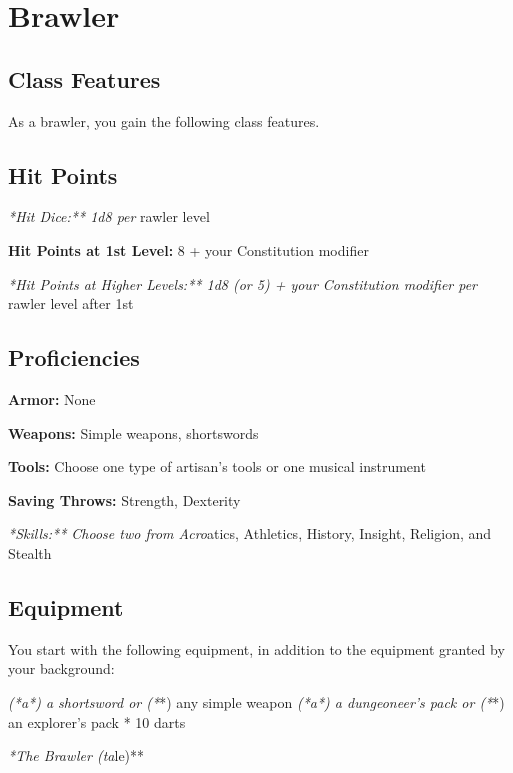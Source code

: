 \section{Brawler}

\subsection{Class Features}

As a brawler, you gain the following class features.

\subsection{Hit Points}

\textit{*Hit Dice:** 1d8 per }rawler level

\textbf{Hit Points at 1st Level:} 8 + your Constitution modifier

\textit{*Hit Points at Higher Levels:** 1d8 (or 5) + your Constitution modifier per }rawler level after 1st

\subsection{Proficiencies}

\textbf{Armor:} None

\textbf{Weapons:} Simple weapons, shortswords

\textbf{Tools:} Choose one type of artisan’s tools or one musical instrument

\textbf{Saving Throws:} Strength, Dexterity

\textit{*Skills:** Choose two from Acro}atics, Athletics, History, Insight, Religion, and Stealth

\subsection{Equipment}

You start with the following equipment, in addition to the equipment granted by your background:

\textit{ (*a*) a shortsword or (*}*) any simple weapon
\textit{ (*a*) a dungeoneer’s pack or (*}*) an explorer’s pack
* 10 darts

\textit{*The Brawler (ta}le)**

